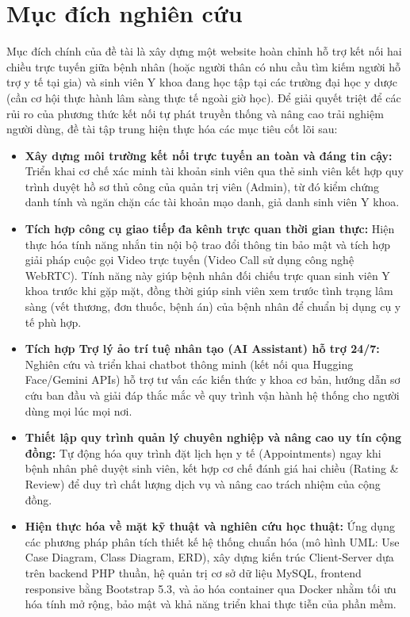 \documentclass[a4paper,13pt]{extreport}
\begin{document}
\section{Mục đích nghiên cứu}
Mục đích chính của đề tài là xây dựng một website hoàn chỉnh hỗ trợ kết nối hai chiều trực tuyến giữa bệnh nhân (hoặc người thân có nhu cầu tìm kiếm người hỗ trợ y tế tại gia) và sinh viên Y khoa đang học tập tại các trường đại học y dược (cần cơ hội thực hành lâm sàng thực tế ngoài giờ học). Để giải quyết triệt để các rủi ro của phương thức kết nối tự phát truyền thống và nâng cao trải nghiệm người dùng, đề tài tập trung hiện thực hóa các mục tiêu cốt lõi sau:
\begin{itemize}
    \item \textbf{Xây dựng môi trường kết nối trực tuyến an toàn và đáng tin cậy:} Triển khai cơ chế xác minh tài khoản sinh viên qua thẻ sinh viên kết hợp quy trình duyệt hồ sơ thủ công của quản trị viên (Admin), từ đó kiểm chứng danh tính và ngăn chặn các tài khoản mạo danh, giả danh sinh viên Y khoa.
    \item \textbf{Tích hợp công cụ giao tiếp đa kênh trực quan thời gian thực:} Hiện thực hóa tính năng nhắn tin nội bộ trao đổi thông tin bảo mật và tích hợp giải pháp cuộc gọi Video trực tuyến (Video Call sử dụng công nghệ WebRTC). Tính năng này giúp bệnh nhân đối chiếu trực quan sinh viên Y khoa trước khi gặp mặt, đồng thời giúp sinh viên xem trước tình trạng lâm sàng (vết thương, đơn thuốc, bệnh án) của bệnh nhân để chuẩn bị dụng cụ y tế phù hợp.
    \item \textbf{Tích hợp Trợ lý ảo trí tuệ nhân tạo (AI Assistant) hỗ trợ 24/7:} Nghiên cứu và triển khai chatbot thông minh (kết nối qua Hugging Face/Gemini APIs) hỗ trợ tư vấn các kiến thức y khoa cơ bản, hướng dẫn sơ cứu ban đầu và giải đáp thắc mắc về quy trình vận hành hệ thống cho người dùng mọi lúc mọi nơi.
    \item \textbf{Thiết lập quy trình quản lý chuyên nghiệp và nâng cao uy tín cộng đồng:} Tự động hóa quy trình đặt lịch hẹn y tế (Appointments) ngay khi bệnh nhân phê duyệt sinh viên, kết hợp cơ chế đánh giá hai chiều (Rating \& Review) để duy trì chất lượng dịch vụ và nâng cao trách nhiệm của cộng đồng.
    \item \textbf{Hiện thực hóa về mặt kỹ thuật và nghiên cứu học thuật:} Ứng dụng các phương pháp phân tích thiết kế hệ thống chuẩn hóa (mô hình UML: Use Case Diagram, Class Diagram, ERD), xây dựng kiến trúc Client-Server dựa trên backend PHP thuần, hệ quản trị cơ sở dữ liệu MySQL, frontend responsive bằng Bootstrap 5.3, và ảo hóa container qua Docker nhằm tối ưu hóa tính mở rộng, bảo mật và khả năng triển khai thực tiễn của phần mềm.
\end{itemize}
\end{document}
